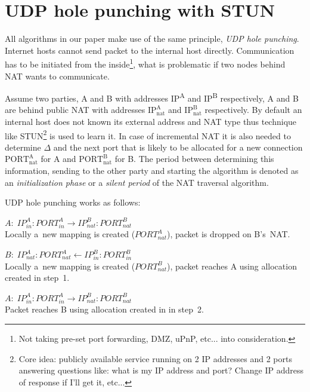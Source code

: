 \documentclass{llncs}
\newcommand{\ignore}[1]{}
\begin{document}
\section{UDP hole punching with STUN}
All algorithms in our paper make use of the same principle, \emph{UDP hole punching}. 
Internet hosts cannot send packet to the internal host directly. 
Communication has to be initiated from the inside\footnote{Not taking
pre-set port forwarding, DMZ, uPnP, etc... into consideration. }, what is problematic if two nodes behind 
NAT wants to communicate.

Assume two parties, A and B with addresses IP\textsuperscript{A} and IP\textsuperscript{B} respectively,
A and B are behind public NAT with addresses $\text{IP}^{\text{A}}_{\text{nat}}$ and $\text{IP}^{\text{B}}_{\text{nat}}$
respectively. By default an internal host does not known its external address and NAT type thus technique like 
STUN\footnote{Core idea: publicly available service running on 2 IP addresses and 2 ports 
answering questions like: what is my IP address and port? Change IP address of response if I'll get it, etc...} 
is used to learn it. In case of incremental NAT it is also needed to determine $\Delta$ and the next port
that is likely to be allocated for a new connection $\text{PORT}^{\text{A}}_{\text{nat}}$ for A and $\text{PORT}^{\text{B}}_{\text{nat}}$
for B. The period between determining this information, sending to the other party and starting the algorithm is
denoted as an \emph{initialization phase} or a \emph{silent period}\ignore{\footnote{Since the algorithm itself does nothing.}} of the NAT traversal algorithm. 

UDP hole punching works as follows:\\
\begin{compactitem}
 \item [1.] $A: \; IP^A_{in}:PORT^A_{in} \longrightarrow IP^B_{nat}:PORT^B_{nat}$ \\
Locally a~new mapping is created ($PORT^A_{nat}$), packet is dropped on B's~NAT.
 \item [2.] $B: \; IP^A_{nat}:PORT^A_{nat} \longleftarrow  IP^B_{in}:PORT^B_{in}$ \\
Locally a~new mapping is created ($PORT^B_{nat}$), packet reaches A using allocation created in step~1.
 \item [3.] $A: \; IP^A_{in}:PORT^A_{in} \longrightarrow IP^B_{nat}:PORT^B_{nat}$ \\
Packet reaches B using allocation created in in step~2.
\end{compactitem}
\end{document}
